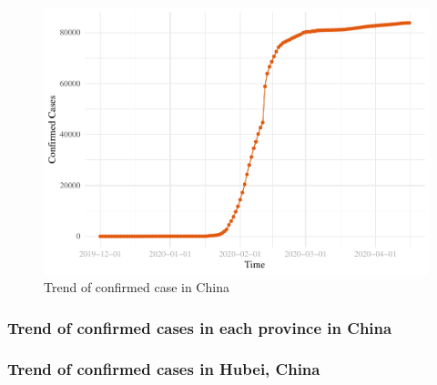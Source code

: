 \documentclass[12pt,]{article}
\newenvironment{Shaded}{\begin{snugshade}}{\end{snugshade}}
\newcommand{\CommentTok}[1]{\textcolor[rgb]{0.56,0.35,0.01}{\textit{#1}}}
\newcommand{\DataTypeTok}[1]{\textcolor[rgb]{0.13,0.29,0.53}{#1}}
\newcommand{\KeywordTok}[1]{\textcolor[rgb]{0.13,0.29,0.53}{\textbf{#1}}}
\newcommand{\NormalTok}[1]{#1}
\newcommand{\OperatorTok}[1]{\textcolor[rgb]{0.81,0.36,0.00}{\textbf{#1}}}
\newcommand{\StringTok}[1]{\textcolor[rgb]{0.31,0.60,0.02}{#1}}
\begin{document}
\begin{figure}
\centering
\includegraphics{Feng_ENV872_Project_files/figure-latex/China_Total_Trend.plot-1.pdf}
\caption{Trend of confirmed case in China}
\end{figure}

\hypertarget{trend-of-confirmed-cases-in-each-province-in-china}{%
\subsubsection{Trend of confirmed cases in each province in
China}\label{trend-of-confirmed-cases-in-each-province-in-china}}

\begin{Shaded}
\end{Shaded}

\hypertarget{trend-of-confirmed-cases-in-hubei-china}{%
\subsubsection{Trend of confirmed cases in Hubei,
China}\label{trend-of-confirmed-cases-in-hubei-china}}
\end{document}

